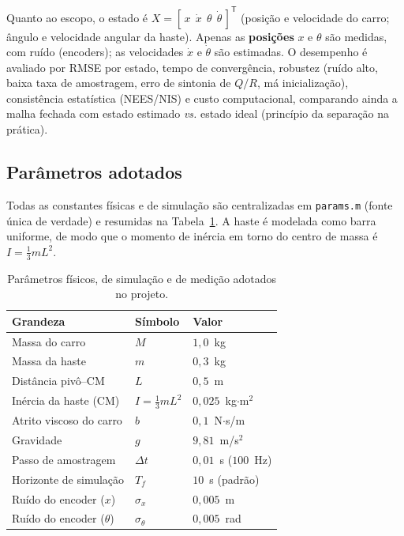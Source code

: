 \documentclass[brazil, 12pt]{article}
\begin{document}
Quanto ao escopo, o estado é
$X = [\,x\ \ \dot{x}\ \ \theta\ \ \dot{\theta}\,]^{\mathsf T}$ (posição e
velocidade do carro; ângulo e velocidade angular da haste). Apenas as
\textbf{posições} $x$ e $\theta$ são medidas, com ruído (encoders); as
velocidades $\dot{x}$ e $\dot{\theta}$ são estimadas. O desempenho é avaliado por
RMSE por estado, tempo de convergência, robustez (ruído alto, baixa taxa de
amostragem, erro de sintonia de $Q/R$, má inicialização), consistência
estatística (NEES/NIS) e custo computacional, comparando ainda a malha fechada
com estado estimado \emph{vs.} estado ideal (princípio da separação na prática).

\subsection{Parâmetros adotados}

Todas as constantes físicas e de simulação são centralizadas em
\texttt{params.m} (fonte única de verdade) e resumidas na
Tabela~\ref{tab:params}. A haste é modelada como barra uniforme, de modo que o
momento de inércia em torno do centro de massa é $I = \tfrac{1}{3}mL^{2}$.

\begin{table}[H]
\centering
\begin{tabular}{l l l}
\hline
\textbf{Grandeza} & \textbf{Símbolo} & \textbf{Valor} \\
\hline
Massa do carro          & $M$            & $1{,}0$~kg \\
Massa da haste          & $m$            & $0{,}3$~kg \\
Distância pivô--CM       & $L$            & $0{,}5$~m \\
Inércia da haste (CM)   & $I=\tfrac{1}{3}mL^{2}$ & $0{,}025$~kg$\cdot$m$^{2}$ \\
Atrito viscoso do carro & $b$            & $0{,}1$~N$\cdot$s/m \\
Gravidade               & $g$            & $9{,}81$~m/s$^{2}$ \\
\hline
Passo de amostragem     & $\Delta t$     & $0{,}01$~s ($100$~Hz) \\
Horizonte de simulação  & $T_f$          & $10$~s (padrão) \\
\hline
Ruído do encoder ($x$)  & $\sigma_x$     & $0{,}005$~m \\
Ruído do encoder ($\theta$) & $\sigma_\theta$ & $0{,}005$~rad \\
\hline
\end{tabular}
\caption{Parâmetros físicos, de simulação e de medição adotados no projeto.}
\label{tab:params}
\end{table}
\end{document}
